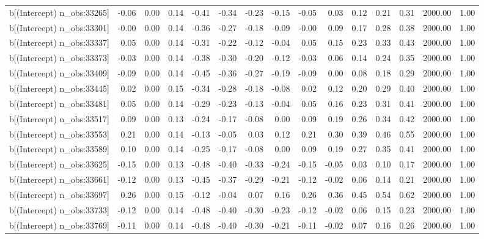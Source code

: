 \begin{table}[ht]
\begin{tabular}{rrrrrrrrrrrrrrr}
  b[(Intercept) n\_obs:33265] & -0.06 & 0.00 & 0.14 & -0.41 & -0.34 & -0.23 & -0.15 & -0.05 & 0.03 & 0.12 & 0.21 & 0.31 & 2000.00 & 1.00 \\ 
  b[(Intercept) n\_obs:33301] & -0.00 & 0.00 & 0.14 & -0.36 & -0.27 & -0.18 & -0.09 & -0.00 & 0.09 & 0.17 & 0.28 & 0.38 & 2000.00 & 1.00 \\ 
  b[(Intercept) n\_obs:33337] & 0.05 & 0.00 & 0.14 & -0.31 & -0.22 & -0.12 & -0.04 & 0.05 & 0.15 & 0.23 & 0.33 & 0.43 & 2000.00 & 1.00 \\ 
  b[(Intercept) n\_obs:33373] & -0.03 & 0.00 & 0.14 & -0.38 & -0.30 & -0.20 & -0.12 & -0.03 & 0.06 & 0.14 & 0.24 & 0.35 & 2000.00 & 1.00 \\ 
  b[(Intercept) n\_obs:33409] & -0.09 & 0.00 & 0.14 & -0.45 & -0.36 & -0.27 & -0.19 & -0.09 & 0.00 & 0.08 & 0.18 & 0.29 & 2000.00 & 1.00 \\ 
  b[(Intercept) n\_obs:33445] & 0.02 & 0.00 & 0.15 & -0.34 & -0.28 & -0.18 & -0.08 & 0.02 & 0.12 & 0.20 & 0.29 & 0.40 & 2000.00 & 1.00 \\ 
  b[(Intercept) n\_obs:33481] & 0.05 & 0.00 & 0.14 & -0.29 & -0.23 & -0.13 & -0.04 & 0.05 & 0.16 & 0.23 & 0.31 & 0.41 & 2000.00 & 1.00 \\ 
  b[(Intercept) n\_obs:33517] & 0.09 & 0.00 & 0.13 & -0.24 & -0.17 & -0.08 & 0.00 & 0.09 & 0.19 & 0.26 & 0.34 & 0.42 & 2000.00 & 1.00 \\ 
  b[(Intercept) n\_obs:33553] & 0.21 & 0.00 & 0.14 & -0.13 & -0.05 & 0.03 & 0.12 & 0.21 & 0.30 & 0.39 & 0.46 & 0.55 & 2000.00 & 1.00 \\ 
  b[(Intercept) n\_obs:33589] & 0.10 & 0.00 & 0.14 & -0.25 & -0.17 & -0.08 & 0.00 & 0.09 & 0.19 & 0.27 & 0.35 & 0.41 & 2000.00 & 1.00 \\ 
  b[(Intercept) n\_obs:33625] & -0.15 & 0.00 & 0.13 & -0.48 & -0.40 & -0.33 & -0.24 & -0.15 & -0.05 & 0.03 & 0.10 & 0.17 & 2000.00 & 1.00 \\ 
  b[(Intercept) n\_obs:33661] & -0.12 & 0.00 & 0.13 & -0.45 & -0.37 & -0.29 & -0.21 & -0.12 & -0.02 & 0.06 & 0.14 & 0.21 & 2000.00 & 1.00 \\ 
  b[(Intercept) n\_obs:33697] & 0.26 & 0.00 & 0.15 & -0.12 & -0.04 & 0.07 & 0.16 & 0.26 & 0.36 & 0.45 & 0.54 & 0.62 & 2000.00 & 1.00 \\ 
  b[(Intercept) n\_obs:33733] & -0.12 & 0.00 & 0.14 & -0.48 & -0.40 & -0.30 & -0.23 & -0.12 & -0.02 & 0.06 & 0.15 & 0.23 & 2000.00 & 1.00 \\ 
  b[(Intercept) n\_obs:33769] & -0.11 & 0.00 & 0.14 & -0.48 & -0.40 & -0.30 & -0.21 & -0.11 & -0.02 & 0.07 & 0.16 & 0.26 & 2000.00 & 1.00 \\ 

\end{tabular}
\end{table}
